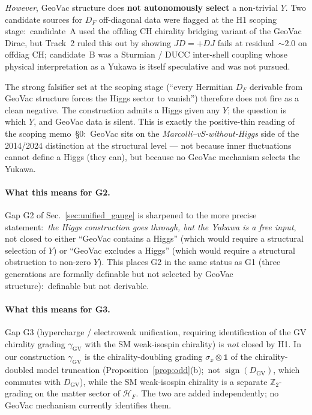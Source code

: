 \documentclass[11pt]{article}
\begin{document}
\emph{However}, GeoVac structure does \textbf{not autonomously
select} a non-trivial $Y$.  Two candidate sources for $D_F$
off-diagonal data were flagged at the H1 scoping stage:\ 
candidate~A used the offdiag CH chirality bridging variant of
the GeoVac Dirac, but Track~2 ruled this out by showing $J D = +D J$ fails at residual~$\sim 2.0$ on offdiag CH; candidate~B was a Sturmian / DUCC inter-shell coupling whose physical interpretation as a Yukawa is itself speculative and was not pursued.

The strong falsifier set at the scoping stage
(``every Hermitian $D_F$ derivable from GeoVac structure forces
the Higgs sector to vanish'') therefore does not fire as a clean
negative.  The construction admits a Higgs given any $Y$; the
question is which $Y$, and GeoVac data is silent.  This is
exactly the positive-thin reading of the scoping memo~\S 0:\
GeoVac sits on the \emph{Marcolli--vS-without-Higgs} side of the
2014/2024 distinction at the structural level --- not because
inner fluctuations cannot define a Higgs (they can), but because
no GeoVac mechanism selects the Yukawa.

\paragraph{What this means for G2.}  Gap G2 of
Sec.~\ref{sec:unified_gauge} is sharpened to the more precise
statement:\ \emph{the Higgs construction goes through, but the
Yukawa is a free input}, not closed to either ``GeoVac contains a
Higgs'' (which would require a structural selection of $Y$) or
``GeoVac excludes a Higgs'' (which would require a structural
obstruction to non-zero $Y$).  This places G2 in the same status
as G1 (three generations are formally definable but not selected
by GeoVac structure):\ definable but not derivable.

\paragraph{What this means for G3.}  Gap G3 (hypercharge /
electroweak unification, requiring identification of the GV
chirality grading $\gamma_{\mathrm{GV}}$ with the SM weak-isospin
chirality) is \emph{not} closed by H1.  In our construction
$\gamma_{\mathrm{GV}}$ is the chirality-doubling grading
$\sigma_x \otimes \mathbb{1}$ of the chirality-doubled model truncation
(Proposition~\ref{prop:odd}(b);\ not $\operatorname{sign}(D_{\mathrm{GV}})$,
which commutes with $D_{\mathrm{GV}}$), while the SM weak-isospin chirality is a separate
$\mathbb{Z}_2$-grading on the matter sector of $\mathcal{H}_F$.
The two are added independently; no GeoVac mechanism currently
identifies them.
\end{document}
